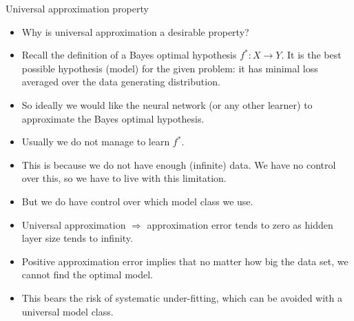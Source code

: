 \documentclass[11pt,compress,t,notes=noshow, xcolor=table]{beamer}
\begin{document}
\begin{vbframe}{Universal approximation property}
  \begin{itemize}
  \item Why is universal approximation a desirable property?
  \vspace{2mm}
  \item Recall the definition of a Bayes optimal hypothesis $f^* : X \to Y$.
    It is the best possible hypothesis (model) for the given problem:
    it has minimal loss averaged over the data generating distribution.
  \vspace{2mm}
  \item So ideally we would like the neural network (or any other
    learner) to approximate the Bayes optimal hypothesis.
  \vspace{2mm}
  \item Usually we do not manage to learn $f^*$.
  \vspace{2mm}
  \item This is because we do not have enough (infinite) data. We have
    no control over this, so we have to live with this limitation.
  \vspace{2mm}
  \item But we do have control over which model class we use.
  \end{itemize}

  \framebreak

  \begin{itemize}
    \vspace{10mm}
    \item Universal approximation $\Rightarrow$ approximation error tends
    to zero as hidden layer size tends to infinity.
    \vspace{5mm}
    \item Positive approximation error implies that no matter  how %
    big the data set, we cannot find the optimal model.
    \vspace{5mm}
    \item This bears the risk of systematic under-fitting, which can be avoided with a universal model class.
  \end{itemize}

  \framebreak


\end{vbframe}
\end{document}
